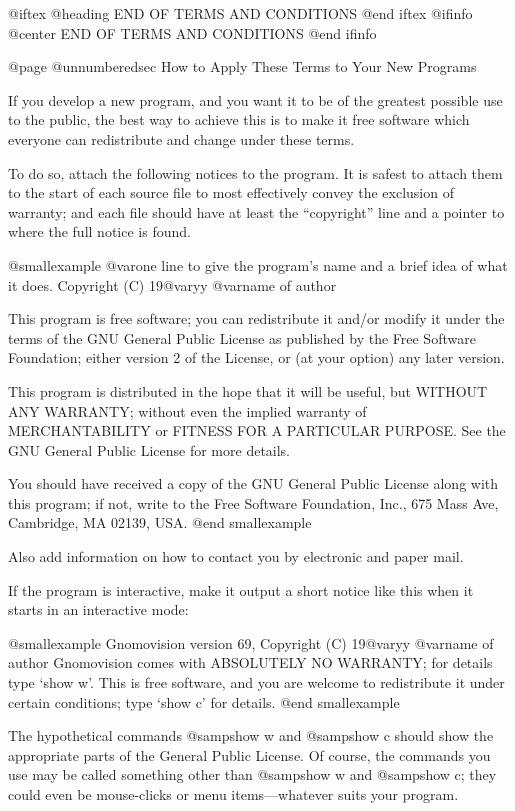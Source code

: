 @iftex
@heading END OF TERMS AND CONDITIONS
@end iftex
@ifinfo
@center END OF TERMS AND CONDITIONS
@end ifinfo

@page
@unnumberedsec How to Apply These Terms to Your New Programs

  If you develop a new program, and you want it to be of the greatest
possible use to the public, the best way to achieve this is to make it
free software which everyone can redistribute and change under these terms.

  To do so, attach the following notices to the program.  It is safest
to attach them to the start of each source file to most effectively
convey the exclusion of warranty; and each file should have at least
the ``copyright'' line and a pointer to where the full notice is found.

@smallexample
@var{one line to give the program's name and a brief idea of what it does.}
Copyright (C) 19@var{yy}  @var{name of author}

This program is free software; you can redistribute it and/or modify 
it under the terms of the GNU General Public License as published by 
the Free Software Foundation; either version 2 of the License, or 
(at your option) any later version.

This program is distributed in the hope that it will be useful,
but WITHOUT ANY WARRANTY; without even the implied warranty of
MERCHANTABILITY or FITNESS FOR A PARTICULAR PURPOSE.  See the
GNU General Public License for more details.

You should have received a copy of the GNU General Public License
along with this program; if not, write to the Free Software
Foundation, Inc., 675 Mass Ave, Cambridge, MA 02139, USA.
@end smallexample

Also add information on how to contact you by electronic and paper mail.

If the program is interactive, make it output a short notice like this
when it starts in an interactive mode:

@smallexample
Gnomovision version 69, Copyright (C) 19@var{yy} @var{name of author}
Gnomovision comes with ABSOLUTELY NO WARRANTY; for details
type `show w'.  
This is free software, and you are welcome to redistribute it 
under certain conditions; type `show c' for details.
@end smallexample

The hypothetical commands @samp{show w} and @samp{show c} should show
the appropriate parts of the General Public License.  Of course, the
commands you use may be called something other than @samp{show w} and
@samp{show c}; they could even be mouse-clicks or menu items---whatever
suits your program.

